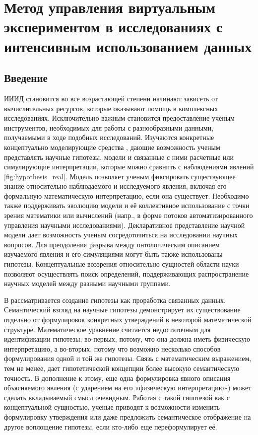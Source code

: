 \chapter{Метод управления виртуальным экспериментом в исследованиях с интенсивным использованием данных} \label{chapt2}
\newtheorem{mydef}{Definition}

\section{Введение}\label{sect1_2_6}

ИИИД становится во все возрастающей степени начинают зависеть от вычислительных ресурсов, которые оказывают помощь в 
комплексных исследованиях. Исключительно важным становится предоставление ученым инструментов, необходимых для работы 
с разнообразными данными, получаемыми в ходе подобных исследований. Изучаются конкретные концептуально моделирующие 
средства \cite{porto2013}, дающие возможность ученым представлять научные гипотезы, модели и связанные с ними расчетные 
или симулирующие интерпретации, которые можно сравнить с наблюдениями явлений \cref{fig:hypothesis_real}. Модель 
позволяет ученым фиксировать существующее знание относительно наблюдаемого и исследуемого явления, включая его 
формальную математическую интерпретацию, если она существует. Необходимо также поддерживать эволюцию модели и её 
коллективное использование с точки зрения математики или вычислений (напр., в форме потоков автоматизированного 
управления научными исследованиями). Декларативное представление научной модели дает возможность ученым сосредоточиться 
на исследовании научных вопросов. Для преодоления разрыва между онтологическим описанием изучаемого явления и его 
симуляциями могут быть также использованы гипотезы. Концептуальные воззрения относительно сущностей области науки 
позволяют осуществлять поиск определений, поддерживающих распространение научных моделей между разными 
научными группами. 

В \cite{Goncalves2013} рассматривается создание гипотезы как проработка связанных данных. Семантический взгляд на 
научные гипотезы демонстрирует их существование отдельно от формулировок конкретных утверждений в некоторой 
математической структуре. Математическое уравнение считается недостаточным для идентификации гипотезы; во-первых, 
потому, что она должна иметь физическую интерпретацию, а во-вторых, потому что возможно несколько способов 
формулирования одной и той же гипотезы. Связь с математическим выражением, тем не менее, дает гипотетической 
концепции более высокую семантическую точность. В дополнение к этому, еще одна формулировка явного описания 
объясняемого явления (с ударением на его «физическую интерпретацию») может сделать вкладываемый смысл очевидным. 
Работая с такой гипотезой как с концептуальной сущностью, ученые приводят к возможности изменить формулировку 
утверждения или даже предложить семантическое отображение на другое воплощение гипотезы, если кто-либо еще 
переформулирует её.

